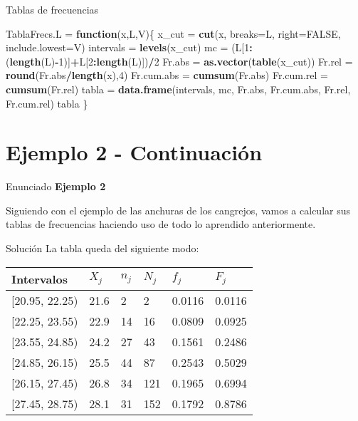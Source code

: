 \documentclass[
  ignorenonframetext,
]{beamer}
\newenvironment{Shaded}{\begin{snugshade}}{\end{snugshade}}
\newcommand{\ControlFlowTok}[1]{\textcolor[rgb]{0.13,0.29,0.53}{\textbf{#1}}}
\newcommand{\DataTypeTok}[1]{\textcolor[rgb]{0.13,0.29,0.53}{#1}}
\newcommand{\DecValTok}[1]{\textcolor[rgb]{0.00,0.00,0.81}{#1}}
\newcommand{\KeywordTok}[1]{\textcolor[rgb]{0.13,0.29,0.53}{\textbf{#1}}}
\newcommand{\NormalTok}[1]{#1}
\newcommand{\OperatorTok}[1]{\textcolor[rgb]{0.81,0.36,0.00}{\textbf{#1}}}
\newcommand{\OtherTok}[1]{\textcolor[rgb]{0.56,0.35,0.01}{#1}}
\newcommand{\StringTok}[1]{\textcolor[rgb]{0.31,0.60,0.02}{#1}}
\begin{document}
\begin{frame}[fragile]{Tablas de frecuencias}
\protect\hypertarget{tablas-de-frecuencias}{}
\begin{Shaded}
\begin{Highlighting}[]
\NormalTok{TablaFrecs.L =}\StringTok{ }\ControlFlowTok{function}\NormalTok{(x,L,V)\{}
\NormalTok{  x\_cut =}\StringTok{ }\KeywordTok{cut}\NormalTok{(x, }\DataTypeTok{breaks=}\NormalTok{L, }\DataTypeTok{right=}\OtherTok{FALSE}\NormalTok{, }\DataTypeTok{include.lowest=}\NormalTok{V)}
\NormalTok{  intervals =}\StringTok{ }\KeywordTok{levels}\NormalTok{(x\_cut)}
\NormalTok{  mc =}\StringTok{ }\NormalTok{(L[}\DecValTok{1}\OperatorTok{:}\NormalTok{(}\KeywordTok{length}\NormalTok{(L)}\OperatorTok{{-}}\DecValTok{1}\NormalTok{)]}\OperatorTok{+}\NormalTok{L[}\DecValTok{2}\OperatorTok{:}\KeywordTok{length}\NormalTok{(L)])}\OperatorTok{/}\DecValTok{2}
\NormalTok{  Fr.abs =}\StringTok{ }\KeywordTok{as.vector}\NormalTok{(}\KeywordTok{table}\NormalTok{(x\_cut)) }
\NormalTok{  Fr.rel =}\StringTok{ }\KeywordTok{round}\NormalTok{(Fr.abs}\OperatorTok{/}\KeywordTok{length}\NormalTok{(x),}\DecValTok{4}\NormalTok{)}
\NormalTok{  Fr.cum.abs =}\StringTok{ }\KeywordTok{cumsum}\NormalTok{(Fr.abs)}
\NormalTok{  Fr.cum.rel =}\StringTok{ }\KeywordTok{cumsum}\NormalTok{(Fr.rel)}
\NormalTok{  tabla =}\StringTok{ }\KeywordTok{data.frame}\NormalTok{(intervals, mc, Fr.abs, Fr.cum.abs, Fr.rel, Fr.cum.rel)}
\NormalTok{  tabla}
\NormalTok{  \}}
\end{Highlighting}
\end{Shaded}
\end{frame}

\hypertarget{ejemplo-2---continuaciuxf3n}{%
\section{Ejemplo 2 - Continuación}\label{ejemplo-2---continuaciuxf3n}}

\begin{frame}{Enunciado}
\protect\hypertarget{enunciado-1}{}
\textbf{Ejemplo 2}

Siguiendo con el ejemplo de las anchuras de los cangrejos, vamos a
calcular sus tablas de frecuencias haciendo uso de todo lo aprendido
anteriormente.
\end{frame}

\begin{frame}{Solución}
\protect\hypertarget{soluciuxf3n-11}{}
La tabla queda del siguiente modo:

\begin{longtable}[]{@{}llllll@{}}
\toprule
Intervalos & \(X_j\) & \(n_j\) & \(N_j\) & \(f_j\) &
\(F_j\)\tabularnewline
\midrule
\endhead
{[}20.95, 22.25) & 21.6 & 2 & 2 & 0.0116 & 0.0116\tabularnewline
{[}22.25, 23.55) & 22.9 & 14 & 16 & 0.0809 & 0.0925\tabularnewline
{[}23.55, 24.85) & 24.2 & 27 & 43 & 0.1561 & 0.2486\tabularnewline
{[}24.85, 26.15) & 25.5 & 44 & 87 & 0.2543 & 0.5029\tabularnewline
{[}26.15, 27.45) & 26.8 & 34 & 121 & 0.1965 & 0.6994\tabularnewline
{[}27.45, 28.75) & 28.1 & 31 & 152 & 0.1792 & 0.8786\tabularnewline
\bottomrule
\end{longtable}
\end{frame}
\end{document}
